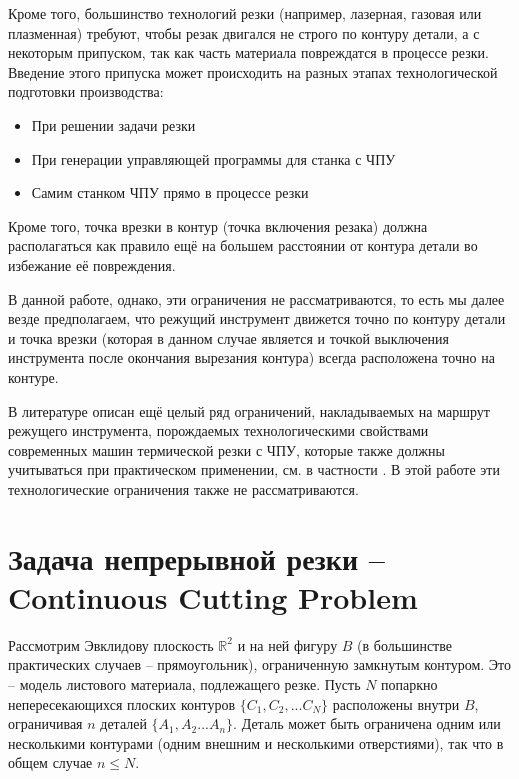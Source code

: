 \documentclass[14pt]{extarticle}
\theoremstyle{plain}%
\theoremstyle{remark}
\begin{document}
Кроме того,
большинство технологий резки
(например, лазерная, газовая или плазменная)
требуют,
чтобы резак двигался не строго по контуру детали,
а с некоторым припуском,
так как часть материала повреждатся в процессе резки.
Введение этого припуска может происходить
на разных этапах технологической подготовки производства:
\begin{itemize}
  \item
  При решении задачи резки
  \item
  При генерации управляющей программы для станка с ЧПУ
  \item
  Самим станком ЧПУ прямо в процессе резки
\end{itemize}

Кроме того,
точка врезки в контур
(точка включения резака)
должна располагаться
как правило ещё на большем расстоянии
от контура детали
во избежание её повреждения.

В данной работе,
однако,
эти ограничения не рассматриваются,
то есть
мы далее везде предполагаем,
что режущий инструмент движется точно по контуру детали
и точка врезки
(которая в данном случае
является и точкой выключения инструмента
после окончания вырезания контура)
всегда расположена точно на контуре.

В литературе описан
ещё целый ряд ограничений,
накладываемых на маршрут режущего инструмента,
порождаемых
технологическими свойствами
современных машин термической резки с ЧПУ,
которые также должны учитываться
при практическом применении,
см. в частности
\cite{Sozopol,Miskolc}.
В этой работе
эти технологические ограничения также не рассматриваются.


\section{Задача непрерывной резки -- Continuous Cutting Problem}

Рассмотрим Эвклидову плоскость
$\mathbb R ^ 2$
и на ней фигуру
$B$
(в большинстве практических случаев -- прямоугольник),
ограниченную замкнутым контуром.
Это -- модель листового материала,
подлежащего резке.
Пусть
$N$
попаркно непересекающихся плоских контуров
$\{C_1, C_2, ... C_N\}$
расположены внутри
$B$,
ограничивая
$n$
деталей
$\{A_1, A_2 ... A_n\}$.
Деталь может быть ограничена
одним или несколькими контурами
(одним внешним и несколькими отверстиями),
так что в общем случае
$n \leqslant N$.
\end{document}
